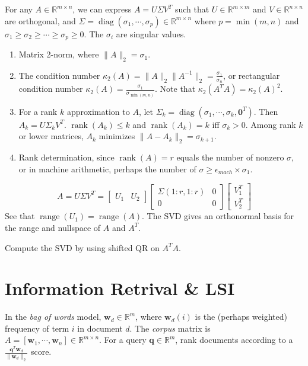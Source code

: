 \documentclass[landscape,10pt,letterpaper]{article}
\newcommand{\heading}[1]{\vspace{-1.5em} \section*{#1} \vspace{-1.0em}}
\begin{document}
\begin{multicols}{4}
For any $A \in \mathbb{R}^{m \times n}$, we can express $A = U \Sigma V^T$ such that $U \in \mathbb{R}^{m \times m}$ and $V \in \mathbb{R}^{n \times n}$ are orthogonal, and $\Sigma = \mathop{diag}(\sigma_1, \cdots, \sigma_p) \in \mathbb{R}^{m \times n}$ where $p = \min(m, n)$ and $\sigma_1 \geq \sigma_2 \geq \cdots \geq \sigma_p \geq 0$.  The $\sigma_i$ are singular values.

\begin{enumerate}[topsep=0pt, partopsep=0pt, itemsep=-4pt]
\item Matrix 2-norm, where $\| A \|_2 = \sigma_1$.
\item The condition number $\kappa_2(A) = \| A \|_2 \| A^{-1} \|_2 = \frac{\sigma_1}{\sigma_n}$, or rectangular condition number $\kappa_2(A) = \frac{\sigma_1}{\sigma_{\min(m,n)}}$.  Note that $\kappa_2(A^TA) = \kappa_2(A)^2$.
\item For a rank $k$ approximation to $A$, let $\Sigma_k=\mathop{diag}(\sigma_1, \cdots, \sigma_k, \mathbf{0}^T)$.  Then $A_k = U \Sigma_k V^T$.  $\mathop{rank}(A_k) \leq k$ and $\mathop{rank}(A_k) = k$ iff $\sigma_k > 0$.  Among rank $k$ or lower matrices, $A_k$ minimizes $\| A - A_k \|_2 = \sigma_{k+1}$.
\item Rank determination, since $\mathop{rank}(A)=r$ equals the number of nonzero $\sigma$, or in machine arithmetic, perhaps the number of $\sigma \geq \epsilon_{mach} \times \sigma_1$.
\end{enumerate}
$$A = U \Sigma V^T = \left[ \begin{array}{cc} U_1 & U_2 \end{array} \right]
\left[ \begin{array}{cc} \Sigma(1:r,1:r) & 0 \\ 0 & 0 \end{array} \right] \left[ \begin{array}{c} V_1^T \\ V_2^T \end{array} \right]$$
See that $\mathop{range}(U_1) = \mathop{range}(A)$.  The SVD gives an orthonormal basis for the range and nullspace of $A$ and $A^T$.

Compute the SVD by using shifted QR on $A^TA$.

\heading{Information Retrival \& LSI}

In the \emph{bag of words} model, $\mathbf{w}_d \in \mathbb{R}^m$, where $\mathbf{w}_d(i)$ is the (perhaps weighted) frequency of term $i$ in document $d$.  The \emph{corpus} matrix is $A = [\mathbf{w}_1, \cdots, \mathbf{w}_n] \in \mathbb{R}^{m \times n}$.  For a query $\mathbf{q} \in \mathbb{R}^m$, rank documents according to a $\frac{\mathbf{q}^T \mathbf{w}_d}{\| \mathbf{w}_d \|_2}$ score.


\end{multicols}
\end{document}

